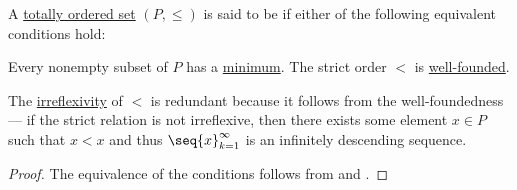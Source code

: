 \begin{definition}\label{def:well_ordered_set}
  A \hyperref[def:totally_ordered_set]{totally ordered set} \( (P, \leq) \) is said to be  if either of the following equivalent conditions hold:
  \begin{thmenum}
     Every nonempty subset of \( P \) has a \hyperref[def:extremal_points/maximum_and_minimum]{minimum}.
     The strict order \( < \) is \hyperref[def:well_founded_relation]{well-founded}.
  \end{thmenum}

  The \hyperref[def:binary_relation/irreflexive]{irreflexivity} of \( < \) is redundant because it follows from the well-foundedness --- if the strict relation is not irreflexive, then there exists some element \( x \in P \) such that \( x < x \) and thus \( \seq{ x }_{k=1}^\infty \) is an infinitely descending sequence.
\end{definition}
\begin{proof}
  The equivalence of the conditions follows from  and .
\end{proof}

